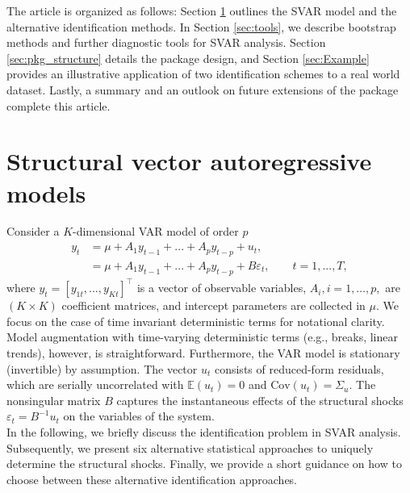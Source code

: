 \documentclass[nojss]{jss}\usepackage[]{graphicx}\usepackage[]{color}
\begin{document}
The article is organized as follows: Section \ref{sec:models} outlines the SVAR model and the alternative identification methods. In Section \ref{sec:tools}, we describe bootstrap methods and further diagnostic tools for SVAR analysis. Section \ref{sec:pkg_structure} details the package design, and Section \ref{sec:Example} provides an illustrative application of two identification schemes to a real world dataset. Lastly, a summary and an outlook on future extensions of the  package complete this article.



\section{Structural vector autoregressive models} \label{sec:models}

{Consider a $K$-dimensional VAR model of order $p$
\begin{align}
y_t &= \mu + A_1y_{t-1} + ... + A_py_{t-p} + u_t,\label{eq:VAR}\\
&= \mu + A_1y_{t-1} + ... + A_py_{t-p} + B\varepsilon_t, \qquad t = 1,..., T,\label{eq:VAR2}
\end{align}
where $y_t = [y_{1t}, ..., y_{Kt}]^\top$ is a vector of observable variables, $A_i, i=1,\ldots,p,$ are $(K \times K)$ coefficient matrices, and intercept parameters are collected in $\mu$. We focus on the case of time invariant deterministic terms for notational clarity. Model augmentation with time-varying deterministic terms (e.g., breaks, linear trends), however, is straightforward. Furthermore, the VAR model is stationary (invertible) by assumption. The vector $u_t$ consists of reduced-form residuals, which are serially uncorrelated with $\mathbb{E}(u_t) = 0$ and $\mbox{Cov}(u_{t}) = \Sigma_u$.
The nonsingular matrix $B$ captures the instantaneous effects of the structural shocks $\varepsilon_t = B^{-1}u_t$ on the variables of the system.\\}
In the following, we briefly discuss the identification problem in SVAR analysis. Subsequently, we present six alternative statistical approaches to uniquely determine the structural shocks. Finally, we provide a short guidance on how to choose between these alternative identification approaches.
\end{document}
